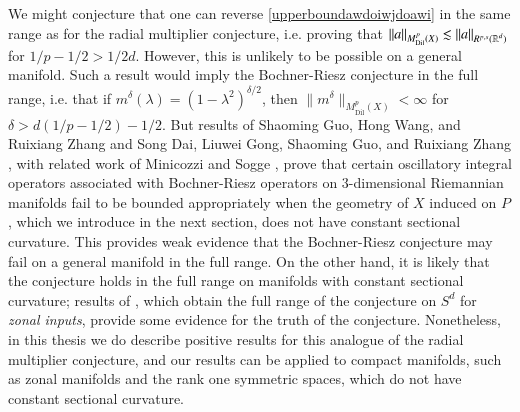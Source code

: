 We might conjecture that one can reverse \eqref{upperboundawdoiwjdoawi} in the same range as for the radial multiplier conjecture, i.e. proving that $\| a \|_{M^p_{\text{Dil}}(X)} \lesssim \| a \|_{R^{p,s}(\operatorname{\mathbb{R}}^d)}$ for $1/p - 1/2 > 1/2d$. However, this is unlikely to be possible on a general manifold. Such a result would imply the Bochner-Riesz conjecture in the full range, i.e. that if $m^\delta(\lambda) = (1 - \lambda^2)^{\delta/2}$, then $\| m^\delta \|_{M^p_{\text{Dil}}(X)} < \infty$ for $\delta > d(1/p - 1/2) - 1/2$. But results of Shaoming Guo, Hong Wang, and Ruixiang Zhang \cite{GuoWangZhang} and Song Dai, Liuwei Gong, Shaoming Guo, and Ruixiang Zhang \cite{DaiGongGuoZhang}, with related work of Minicozzi and Sogge \cite{Minicozzi}, prove that certain oscillatory integral operators associated with Bochner-Riesz operators on $3$-dimensional Riemannian manifolds fail to be bounded appropriately when the geometry of $X$ induced on $P$, which we introduce in the next section, does not have constant sectional curvature. This provides weak evidence that the Bochner-Riesz conjecture may fail on a general manifold in the full range. On the other hand, it is likely that the conjecture holds in the full range on manifolds with constant sectional curvature; results of \cite{Alladi}, which obtain the full range of the conjecture on $S^d$ for \emph{zonal inputs}, provide some evidence for the truth of the conjecture. Nonetheless, in this thesis we do describe positive results for this analogue of the radial multiplier conjecture, and our results can be applied to compact manifolds, such as zonal manifolds and the rank one symmetric spaces, which do not have constant sectional curvature.


%
%
%
%
%


